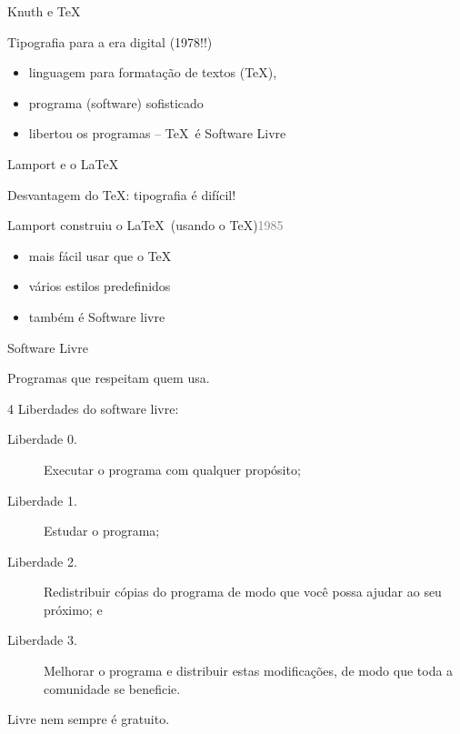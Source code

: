 \documentclass{beamer}
\begin{document}
\begin{frame}{Knuth e \TeX}

\begin{center}
\Large Tipografia para a era digital \pause (1978!!)
\end{center}

\pause

\bigskip

\begin{itemize}
\item linguagem para formatação de textos (\TeX),
\item programa (software) sofisticado
\item libertou os programas -- \TeX\ é \alert{Software Livre}
\end{itemize}
\end{frame}

\begin{frame}{Lamport e o \LaTeX}

Desvantagem do \TeX: tipografia é difícil!

\pause\medskip

Lamport construiu o \LaTeX\ (usando o \TeX)\hfill{\small\textcolor{gray}{1985}}

\pause\bigskip

\begin{itemize}
\item mais fácil usar que o \TeX
\item vários estilos predefinidos 
\item também é \alert{Software livre}
\end{itemize}
\end{frame}

\begin{frame}{Software Livre}

\begin{center}
Programas que respeitam quem usa.


\pause\bigskip

\end{center}


\alert{4 Liberdades do software livre}:

\pause\medskip

\begin{description}
\item[\small Liberdade 0.] \alert{Executar} o programa com qualquer propósito;\pause
\item[\small Liberdade 1.] \alert{Estudar} o programa;\pause
\item[\small Liberdade 2.] \alert{Redistribuir} cópias do programa de modo que você possa ajudar ao seu próximo; e\pause
\item[\small Liberdade 3.] \alert{Melhorar} o programa e distribuir estas modificações, de modo que toda a comunidade se beneficie.
\end{description}

\pause
\begin{center}
Livre nem sempre é gratuito.
\end{center}
\end{frame}
\end{document}
